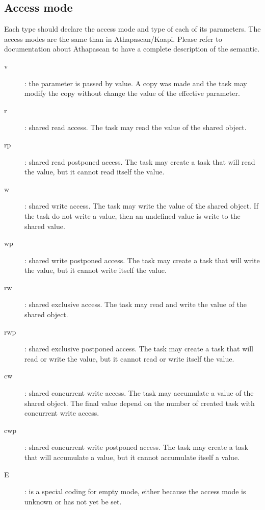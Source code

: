 \documentclass[12pt]{report}
\begin{document}
\subsection{Access mode}

Each type should declare the access mode and type of each of its parameters. The access modes are the same than in Athapascan/Kaapi. Please refer to documentation about Athapascan to have a complete description of the semantic.
\begin{description}
\item [v]: the parameter is passed by value. A copy was made and the task may modify the copy without change the value of the effective parameter.
\item [r]: shared read access. The task may read the value of the shared object.
\item [rp]: shared read postponed access. The task may create a task that will read the value, but it cannot read itself the value.
\item [w]: shared write access. The task may write the value of the shared object. If the task do not write a value, then an undefined value is write to the shared value.
\item [wp]: shared write postponed access. The task may create a task that will write the value, but it cannot write itself the value.
\item [rw]: shared exclusive access. The task may read and write the value of the shared object.
\item [rwp]: shared exclusive postponed access. The task may create a task that will read or write the value, but it cannot read or write itself the value.
\item [cw]: shared concurrent write access. The task may accumulate a value of the shared object. The final value depend on the number of created task with concurrent write access.
\item [cwp]: shared concurrent write postponed access. The task may create a task that will accumulate a value, but it cannot accumulate itself a value.
\item [E]: is a special coding for empty mode, either because the access mode is unknown or has not yet be set.
\end{description}
\end{document}
